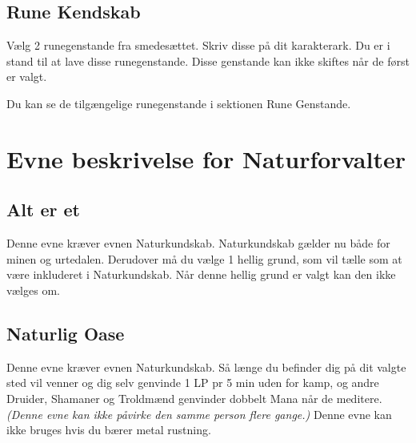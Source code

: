\subsection{Rune Kendskab}

Vælg 2 runegenstande fra smedesættet. Skriv disse på dit karakterark. Du er i stand til at lave disse runegenstande. Disse genstande kan ikke skiftes når de først er valgt. 

Du kan se de tilgængelige runegenstande i sektionen Rune Genstande.

\section{Evne beskrivelse for Naturforvalter}

\subsection{Alt er et}
Denne evne kræver evnen Naturkundskab. Naturkundskab gælder nu både for minen og urtedalen. Derudover må du vælge 1 hellig grund, som vil tælle som at være inkluderet i Naturkundskab. Når denne hellig grund er valgt kan den ikke vælges om.



\subsection{Naturlig Oase}
Denne evne kræver evnen Naturkundskab. Så længe du befinder dig på dit valgte sted vil venner og dig selv genvinde 1 LP pr 5 min uden for kamp, og andre Druider, Shamaner og Troldmænd genvinder dobbelt Mana når de meditere. \textit{(Denne evne kan ikke påvirke den samme person flere gange.)} Denne evne kan ikke bruges hvis du bærer metal rustning.


